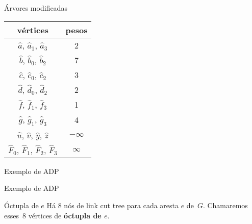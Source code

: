 \documentclass{IFES-beamer}
\newcommand{\defi}[1]{\textbf{#1}} %
\begin{document}
\begin{frame}{Árvores modificadas}
\begin{minipage}[H]{0.3\textwidth}
\centering
\begin{tabular}{| c  c |} 
 \hline
 vértices & pesos\\
 \hline
 $\hat a$, $\hat a_1$, $\hat a_3$ & 2 \\ 
 \hline
 $\hat b$, $\hat b_0$, $\hat b_2$ & 7 \\
 \hline
 $\hat c$, $\hat c_0$, $\hat c_2$ & 3 \\
 \hline
 $\hat d$, $\hat d_0$, $\hat d_2$ & 2 \\
 \hline
 $\hat f$, $\hat f_1$, $\hat f_3$ & 1 \\
 \hline
 $\hat g$, $\hat g_1$, $\hat g_3$ & 4 \\
 \hline
 $\hat u$, $\hat v$, $\hat y$, $\hat z$ & $-\infty$ \\
 \hline
 $\hat F_0$, $\hat F_1$, $\hat F_2$, $\hat F_3$ & $\infty$ \\
 \hline
\end{tabular}
\end{minipage}
\begin{minipage}[H]{0.5\textwidth}
    \centering
\scalebox{.7}{

}
\end{minipage}
\end{frame}

\begin{frame}{Exemplo de ADP}
\begin{figure}[htb]
\scalebox{1}{
\centering

}
\label{fig:MSF-figura-4}
\end{figure}
\end{frame}
\begin{frame}{Exemplo de ADP}
\begin{block}{Óctupla de $e$}
Há $8$ nós de link cut tree para cada aresta $e$ de~$G$.
Chamaremos esses~$8$ vértices de \defi{óctupla de $e$}.
\end{block}
\begin{figure}[htb]
\scalebox{1}{
\centering

}
\end{figure}
\end{frame}
\end{document}
